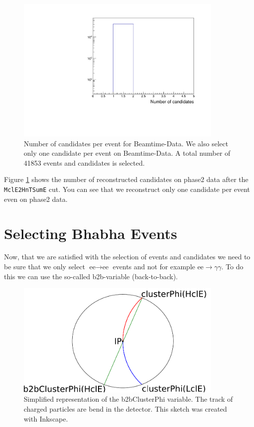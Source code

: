 \documentclass[a4paper,11pt,twosided,final,german,openbib,pdftex,listof=totoc,bibliography=totoc]{scrbook}
\begin{document}
\begin{figure}[h!]
	\centering
	\includegraphics[width=10cm]{Cuts/Data/nCandData.pdf}
	\caption[Number Of Candidates Per Event for Beamtime-Data (All Cuts)]{Number of candidates per event for Beamtime-Data. We also select only one candidate per event on Beamtime-Data. A total number of 41853 events and candidates is selected.}
	\label{fig:nCandData}
\end{figure}

Figure \ref{fig:nCandData} shows the number of reconstructed candidates on phase2 data after the \texttt{MclE2HnTSumE} cut. You can see that we reconstruct only one candidate per event even on phase2 data.



\section{Selecting Bhabha Events}
\label{sec:SelectingElectronPositron}

Now, that we are satisfied with the selection of events and candidates we need to be sure that we only select $\textrm{ee} \rightarrow \textrm{ee}$ events and not for example $\textrm{ee} \rightarrow \gamma \gamma$. To do this we can use the so-called b2b-variable (back-to-back).

\begin{figure}[h!]
	\centering
	\includegraphics[width=10cm]{Bilder/b2b_2}
	\caption[Sketch Of The b2bClusterPhi Variable]{Simplified representation of the b2bClusterPhi variable. The track of charged particles are bend in the detector. This sketch was created with Inkscape.}
	\label{fig:Sketchb2b}
\end{figure}
\end{document}
